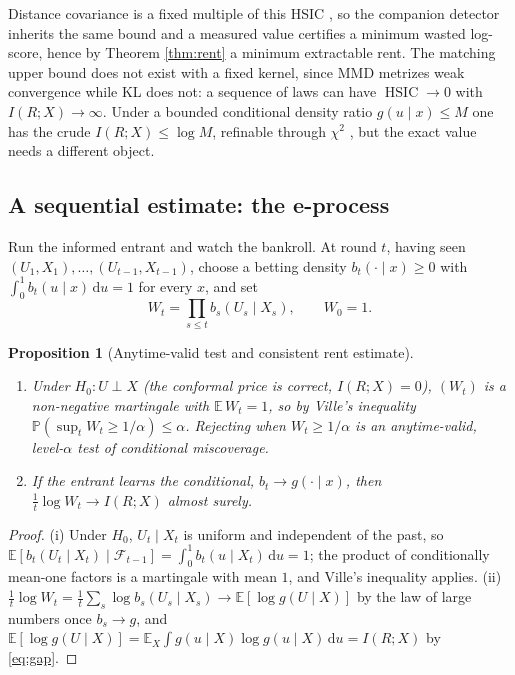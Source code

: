 \documentclass[11pt]{article}
\newtheorem{proposition}{Proposition}
\begin{document}
Distance covariance \citep{szekely2007} is a fixed multiple of this HSIC \citep{sejdinovic2013}, so the companion
detector inherits the same bound and a measured value certifies a minimum wasted log-score, hence
by Theorem \ref{thm:rent} a minimum extractable rent. The matching upper bound does not exist with
a fixed kernel, since MMD metrizes weak convergence \citep{simongabriel2023} while KL does not: a
sequence of laws can have $\operatorname{HSIC}\to 0$ with $I(R;X)\to\infty$. Under a bounded
conditional density ratio $g(u\mid x)\le M$ one has the crude $I(R;X)\le\log M$, refinable through
$\chi^2$ \citep{wangtay2022}, but the exact value needs a different object.

\subsection{A sequential estimate: the e-process}

Run the informed entrant and watch the bankroll. At round $t$, having seen
$(U_1,X_1),\dots,(U_{t-1},X_{t-1})$, choose a betting density $b_t(\cdot\mid x)\ge 0$ with
$\int_0^1 b_t(u\mid x)\,\mathrm du=1$ for every $x$, and set
\begin{equation}
W_t=\prod_{s\le t} b_s(U_s\mid X_s),\qquad W_0=1.
\end{equation}

\begin{proposition}[Anytime-valid test and consistent rent estimate]\label{prop:eprocess}
\quad
\begin{enumerate}
\item[(i)] Under $H_0:U\perp X$ (the conformal price is correct, $I(R;X)=0$), $(W_t)$ is a
non-negative martingale with $\mathbb E\,W_t=1$, so by Ville's inequality
$\mathbb P(\sup_t W_t\ge 1/\alpha)\le\alpha$. Rejecting when $W_t\ge 1/\alpha$ is an anytime-valid,
level-$\alpha$ test of conditional miscoverage.
\item[(ii)] If the entrant learns the conditional, $b_t\to g(\cdot\mid x)$, then
$\tfrac1t\log W_t\to I(R;X)$ almost surely.
\end{enumerate}
\end{proposition}

\begin{proof}
(i) Under $H_0$, $U_t\mid X_t$ is uniform and independent of the past, so
$\mathbb E[b_t(U_t\mid X_t)\mid\mathcal F_{t-1}]=\int_0^1 b_t(u\mid X_t)\,\mathrm du=1$; the product
of conditionally mean-one factors is a martingale with mean $1$, and Ville's inequality applies.
(ii) $\tfrac1t\log W_t=\tfrac1t\sum_s\log b_s(U_s\mid X_s)\to\mathbb E[\log g(U\mid X)]$ by the law
of large numbers once $b_s\to g$, and $\mathbb E[\log g(U\mid X)]=\mathbb E_X\int g(u\mid X)\log
g(u\mid X)\,\mathrm du=I(R;X)$ by \eqref{eq:gap}.
\end{proof}
\end{document}

